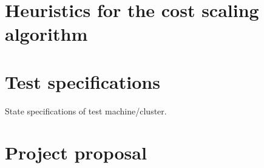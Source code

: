 \documentclass[12pt,a4paper,twoside,notitlepage]{report}
\theoremstyle{plain}
\theoremstyle{definition}
\theoremstyle{remark}
\begin{document}
\cleardoublepage


\cleardoublepage


\cleardoublepage


\cleardoublepage

\printbibliography[heading=bibintoc,category=cited]

\printbibliography[title={WARNING: Uncited},notcategory=cited]


\appendix
\chapter{Heuristics for the cost scaling algorithm} \label{appendix:csheuristics}
 

\chapter{Test specifications}
State specifications of test machine/cluster.

\chapter{Project proposal} \label{appendix:proposal}

\end{document}
